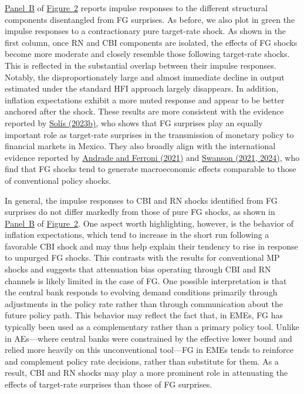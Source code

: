 \documentclass[\latexroot/\projectname]{subfiles}
\begin{document}

 

\hyperlink{Panel BF1}{Panel~B} of \hyperlink{Figure~2}{Figure~2} reports impulse responses to the different structural components disentangled from FG surprises. As before, we also plot in green the impulse responses to a contractionary pure target-rate shock. As shown in the first column, once RN and CBI components are isolated, the effects of FG shocks become more moderate and closely resemble those following target-rate shocks. This is reflected in the substantial overlap between their impulse responses. Notably, the disproportionately large and almost immediate decline in output estimated under the standard HFI approach largely disappears. In addition, inflation expectations exhibit a more muted response and appear to be better anchored after the shock. These results are more consistent with the evidence reported by \hyperlink{Solis (2023b)}{Sol\'{i}s (2023b)}, who shows that FG surprises play an equally important role as target-rate surprises in the transmission of monetary policy to financial markets in Mexico. They also broadly align with the international evidence reported by \hyperlink{Andrade and Ferroni (2021)}{Andrade and Ferroni (2021)} and \hyperlink{Swanson (2021, 2024)}{Swanson (2021, 2024)}, who find that FG shocks tend to generate macroeconomic effects comparable to those of conventional policy shocks.

In general, the impulse responses to CBI and RN shocks identified from FG surprises do not differ markedly from those of pure FG shocks, as shown in \hyperlink{Panel BF1}{Panel~B} of \hyperlink{Figure~2}{Figure~2}. One aspect worth highlighting, however, is the behavior of inflation expectations, which tend to increase in the short run following a favorable CBI shock and may thus help explain their tendency to rise in response to unpurged FG shocks. This contrasts with the results for conventional MP shocks and suggests that attenuation bias operating through CBI and RN channels is likely limited in the case of FG. One possible interpretation is that the central bank responds to evolving demand conditions primarily through adjustments in the policy rate rather than through communication about the future policy path. This behavior may reflect the fact that, in EMEs, FG has typically been used as a complementary rather than a primary policy tool. Unlike in AEs---where central banks were constrained by the effective lower bound and relied more heavily on this unconventional tool---FG in EMEs tends to reinforce and complement policy rate decisions, rather than substitute for them. As a result, CBI and RN shocks may play a more prominent role in attenuating the effects of target-rate surprises than those of FG surprises.
\end{document}
